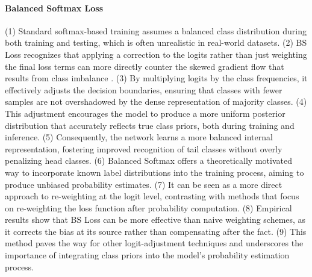\paragraph{Balanced Softmax Loss}
(1) Standard softmax-based training assumes a balanced class distribution during both training and testing, which is often unrealistic in real-world datasets.
(2) BS Loss recognizes that applying a correction to the logits rather than just weighting the final loss terms can more directly counter the skewed gradient flow that results from class imbalance \cite{zhang2023deep}.
(3) By multiplying logits by the class frequencies, it effectively adjusts the decision boundaries, ensuring that classes with fewer samples are not overshadowed by the dense representation of majority classes.
(4) This adjustment encourages the model to produce a more uniform posterior distribution that accurately reflects true class priors, both during training and inference.
(5) Consequently, the network learns a more balanced internal representation, fostering improved recognition of tail classes without overly penalizing head classes.
(6) Balanced Softmax offers a theoretically motivated way to incorporate known label distributions into the training process, aiming to produce unbiased probability estimates.
(7) It can be seen as a more direct approach to re-weighting at the logit level, contrasting with methods that focus on re-weighting the loss function after probability computation.
(8) Empirical results show that BS Loss can be more effective than naive weighting schemes, as it corrects the bias at its source rather than compensating after the fact.
(9) This method paves the way for other logit-adjustment techniques and underscores the importance of integrating class priors into the model’s probability estimation process.

